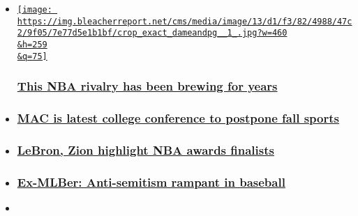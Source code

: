 \begin{itemize}
\item
  \href{https://bleacherreport.com/articles/2903713-damian-lillard-rivalry-with-paul-george-pat-beverley-has-been-brewing-for-years?utm_source=cnn.com\&utm_medium=referral\&utm_campaign=editorial}{\texttt{[image: https://img.bleacherreport.net/cms/media/image/13/d1/f3/82/4988/47c2/9f05/7e77d5e1b1bf/crop\_exact\_dameandpg\_\_1\_.jpg?w=460\\\&h=259\\\&q=75]}}

  \hypertarget{this-nba-rivalry-has-been-brewing-for-years}{%
  \subsubsection{\texorpdfstring{\href{https://bleacherreport.com/articles/2903713-damian-lillard-rivalry-with-paul-george-pat-beverley-has-been-brewing-for-years?utm_source=cnn.com\&utm_medium=referral\&utm_campaign=editorial}{This
  NBA rivalry has been brewing for
  years}}{This NBA rivalry has been brewing for years}}\label{this-nba-rivalry-has-been-brewing-for-years}}
\item
  \hypertarget{mac-is-latest-college-conference-to-postpone-fall-sports}{%
  \subsubsection{\texorpdfstring{\href{https://bleacherreport.com/articles/2903658-mac-reportedly-cancels-football-season-amid-covid-19-intends-to-play-in-spring?utm_source=cnn.com\&utm_medium=referral\&utm_campaign=editorial}{MAC
  is latest college conference to postpone fall
  sports}}{MAC is latest college conference to postpone fall sports}}\label{mac-is-latest-college-conference-to-postpone-fall-sports}}
\item
  \hypertarget{lebron-zion-highlight-nba-awards-finalists-}{%
  \subsubsection{\texorpdfstring{\href{https://bleacherreport.com/articles/2903671-nba-announces-finalists-for-mvp-rookie-of-the-year-6th-man-of-the-year-more?utm_source=cnn.com\&utm_medium=referral\&utm_campaign=editorial}{LeBron,
  Zion highlight NBA awards finalists
  }}{LeBron, Zion highlight NBA awards finalists }}\label{lebron-zion-highlight-nba-awards-finalists-}}
\item
  \hypertarget{ex-mlber-anti-semitism-rampant-in-baseball}{%
  \subsubsection{\texorpdfstring{\href{https://bleacherreport.com/articles/2903660-ex-mlb-player-cody-decker-says-anti-semitism-rampant-in-baseball?utm_source=cnn.com\&utm_medium=referral\&utm_campaign=editorial}{Ex-MLBer:
  Anti-semitism rampant in
  baseball}}{Ex-MLBer: Anti-semitism rampant in baseball}}\label{ex-mlber-anti-semitism-rampant-in-baseball}}
\item
  \hypertarget{76ers-need-more-from-their-star}{%
}
\end{itemize}

